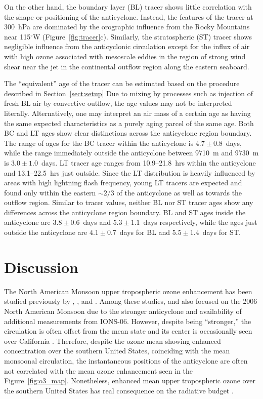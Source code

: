 On the other hand, the boundary layer (BL) tracer shows little correlation with
the shape or positioning of the anticyclone. Instead, the features of the tracer
at 300~hPa are dominated by the orographic influence from the Rocky Mountains
near 115$^\circ$W (Figure~\ref{fig:tracer}c). Similarly, the stratospheric (ST) tracer
shows negligible influence from the anticyclonic circulation except for the influx
of air with high ozone associated with mesoscale eddies in the region of strong
wind shear near the jet in the continental outflow region along the eastern seaboard.

The ``equivalent'' age of the tracer can be estimated based on the procedure described in Section~\ref{sect:setup}
Due to mixing by processes such as injection of fresh BL air by convective outflow,
the age values may not be interpreted literally. Alternatively, one may interpret
an air mass of a certain age as having the same expected characteristics as a
purely aging parcel of the same age. Both BC and LT ages show clear distinctions
across the anticyclone region boundary. The range of ages for the BC tracer within
the anticyclone is $4.7\pm0.8$~days, while the range immediately outside the anticyclone
between 9710~m and 9730~m is $3.0\pm1.0$~days. LT tracer age ranges from 10.9--21.8~hrs
within the anticyclone and 13.1--22.5~hrs just outside. Since the LT distribution is
heavily influenced by areas with high lightning flash frequency, young LT tracers
are expected and found  only within the eastern $\sim2/3$ of the anticyclone as
well as towards the outflow region. Similar to tracer values, neither BL nor ST tracer ages show
any differences across the anticyclone region boundary. BL and ST ages inside
the anticyclone are $3.8\pm0.6$~days and $5.3\pm1.1$~days respectively, while
the ages just outside the anticyclone are $4.1\pm0.7$~days for BL and $5.5\pm1.4$~days for ST.

\section{Discussion}\label{sect:disscusion}

The North American Monsoon upper tropospheric ozone enhancement has
been studied previously by \citet{Li:2005ss},
\citet{Cooper:2006dq,Cooper:2007cr,Cooper:2009nx}, and \citet{Barth:2012qf}.
Among these studies, \citet{Cooper:2007cr} and \citet{Barth:2012qf} also focused
on the 2006 North American Monsoon due to the stronger anticyclone
and availability of additional measurements from IONS-06. However, despite
being ``stronger,'' the circulation is often offset from the mean state and its center is
occasionally seen over California \citep{Barth:2012qf}. Therefore, despite the
ozone mean showing enhanced concentration over the southern United States, coinciding
with the mean monsoonal circulation, the instantaneous positions of the anticyclone are
often not correlated with the mean ozone enhancement seen in the Figure~\ref{fig:o3_map}.
Nonetheless, enhanced mean upper tropospheric ozone over the southern United States
has real consequence on the radiative budget \citep{Cooper:2007cr}.

